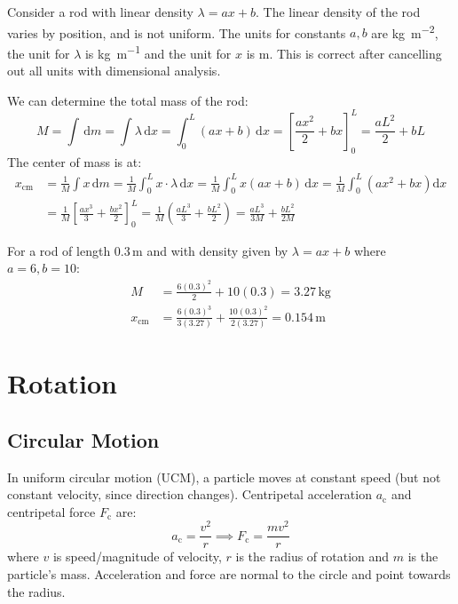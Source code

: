 \documentclass{article}
\newcommand{\example}[2]{\begin{tcolorbox}[title={Example: #1},colback=brown!5!white,colframe=brown!75!black,parbox=false] #2 \end{tcolorbox}}
\begin{document}
\example{Rod with non-uniform linear density}{
	Consider a rod with linear density $\lambda=ax+b$. The linear density of the rod varies by position, and is not uniform. The units for constants $a,b$ are \si{\kilo\gram\per\meter^2}, the unit for $\lambda$ is \si{\kilo\gram\per\meter} and the unit for $x$ is \si{\meter}. This is correct after cancelling out all units with dimensional analysis.

	We can determine the total mass of the rod:
	\begin{equation*}
	    M
		=\int \,\mathrm{d}m
		=\int \lambda\,\mathrm{d}x
		=\int_{0}^{L}(ax+b)\,\mathrm{d}x
		=\left[\frac{ax^2}{2}+bx\right]_{0}^{L}
		=\frac{aL^2}{2}+bL
	\end{equation*}
	The center of mass is at:
	\begin{align*}
	    x_ \text{cm}
		&=\frac1M \int x\,\mathrm{d}m
		=\frac1M \int_{0}^{L}x\cdot\lambda\,\mathrm{d}x
		=\frac1M \int_{0}^{L}x(ax+b)\,\mathrm{d}x
		=\frac1M \int_{0}^{L}\left( ax^2+bx \right)\mathrm{d}x \\
		&=\frac1M \left[\frac{ax^3}{3}+\frac{bx^2}{2}\right]_{0}^{L}
		=\frac1M \left( \frac{aL^3}{3}+\frac{bL^2}{2} \right)
		=\frac{aL^3}{3M}+\frac{bL^2}{2M}
	\end{align*}

	For a rod of length $0.3\,\si{\meter}$ and with density given by $\lambda=ax+b$ where $a=6,b=10$:
	\begin{align*}
		M&=\frac{6(0.3)^2}{2}+10(0.3)=3.27\,\si{\kilo\gram} \\
		x_\text{cm}&=\frac{6(0.3)^3}{3(3.27)}+\frac{10(0.3)^2}{2(3.27)}=0.154\,\si{\meter}
	\end{align*}
}

\section{Rotation}
\label{sec:rotation}

\subsection{Circular Motion}

In uniform circular motion (UCM), a particle moves at constant speed (but not constant velocity, since direction changes). Centripetal acceleration $a_\text{c}$ and centripetal force $F_\text{c}$ are:
\begin{equation*}
	a_\text{c}=\frac{v^2}{r}
	\implies F_\text{c}=\frac{mv^2}{r}
\end{equation*}
where $v$ is speed/magnitude of velocity, $r$ is the radius of rotation and $m$ is the particle's mass. Acceleration and force are normal to the circle and point towards the radius.
\end{document}
